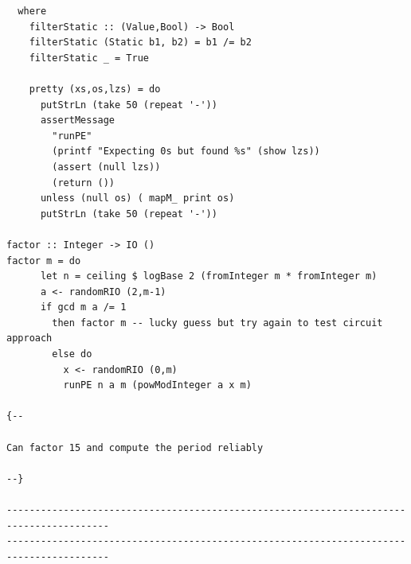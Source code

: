 \documentclass{article}
\begin{document}
\begin{verbatim}
  where
    filterStatic :: (Value,Bool) -> Bool
    filterStatic (Static b1, b2) = b1 /= b2
    filterStatic _ = True
    
    pretty (xs,os,lzs) = do
      putStrLn (take 50 (repeat '-'))
      assertMessage
        "runPE"
        (printf "Expecting 0s but found %s" (show lzs))
        (assert (null lzs))
        (return ())
      unless (null os) ( mapM_ print os)
      putStrLn (take 50 (repeat '-'))

factor :: Integer -> IO ()
factor m = do
      let n = ceiling $ logBase 2 (fromInteger m * fromInteger m)
      a <- randomRIO (2,m-1)
      if gcd m a /= 1 
        then factor m -- lucky guess but try again to test circuit approach
        else do
          x <- randomRIO (0,m)
          runPE n a m (powModInteger a x m)

{--

Can factor 15 and compute the period reliably

--}

----------------------------------------------------------------------------------------
----------------------------------------------------------------------------------------

\end{verbatim}

\end{document}
